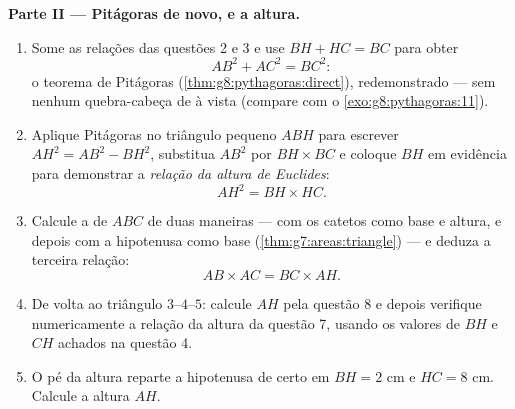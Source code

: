 \begin{problem}[{Problema de fim de semana --- a altura de um triângulo
retângulo: $AB^2 = BH \times BC$, $AH^2 = BH \times HC$, uma segunda
demonstração de Pitágoras e uma máquina de construir raízes
quadradas}]
\medskip
\noindent\textbf{Parte II --- Pitágoras de novo, e a altura.}
\begin{enumerate}[resume]
  \item Some as relações das questões 2 e 3 e use $BH + HC = BC$ para
        obter
        \[
        AB^2 + AC^2 = BC^2 :
        \]
        o teorema de Pitágoras (\cref{thm:g8:pythagoras:direct}),
        redemonstrado --- sem nenhum quebra-cabeça de  à vista
        (compare com o \cref{exo:g8:pythagoras:11}).
  \item Aplique Pitágoras no triângulo pequeno $ABH$ para escrever
        $AH^2 = AB^2 - BH^2$, substitua $AB^2$ por $BH \times BC$ e
        coloque $BH$ em evidência para demonstrar a \emph{relação da
        altura de Euclides}:
        \[
        AH^2 = BH \times HC .
        \]
  \item Calcule a  de $ABC$ de duas maneiras --- com os catetos
        como base e altura, e depois com a hipotenusa como base
        (\cref{thm:g7:areas:triangle}) --- e deduza a terceira
        relação:
        \[
        AB \times AC = BC \times AH .
        \]
  \item De volta ao triângulo $3$--$4$--$5$: calcule $AH$ pela questão
        8 e depois verifique numericamente a relação da altura da
        questão 7, usando os valores de $BH$ e $CH$ achados na questão
        4.
  \item O pé da altura reparte a hipotenusa de certo  em  $BH = 2$ cm e $HC = 8$ cm. Calcule a
        altura $AH$.
\end{enumerate}


\end{problem}
